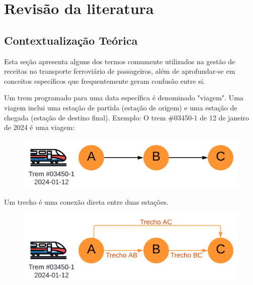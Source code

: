 \chapter{Revisão da literatura}

\section{Contextualização Teórica}
Esta seção apresenta alguns dos termos comumente utilizados na gestão de receitas no transporte ferroviário de passageiros, além de aprofundar-se em conceitos específicos que frequentemente geram confusão entre si.

\begin{description}[style=unboxed, leftmargin=0cm]

	\item[Viagem:] Um trem programado para uma data específica é denominado "viagem". Uma viagem inclui uma estação de partida (estação de origem) e uma estação de chegada (estação de destino final). Exemplo: O trem \#03450-1 de 12 de janeiro de 2024 é uma viagem:

        \begin{figure}[H]
            \begin{center}
                \includegraphics[scale=0.12]{img/viagem.png}
                \label{fig: viagem}
            \end{center}
        \end{figure}
         \vspace{-1cm}

	\item[Trecho e itinerário:] Um trecho é uma conexão direta entre duas estações.

        \begin{figure}[H]
            \begin{center}
                \includegraphics[scale=0.12]{img/trecho.png}
                \label{fig: trecho}
            \end{center}
        \end{figure}


\end{description}
